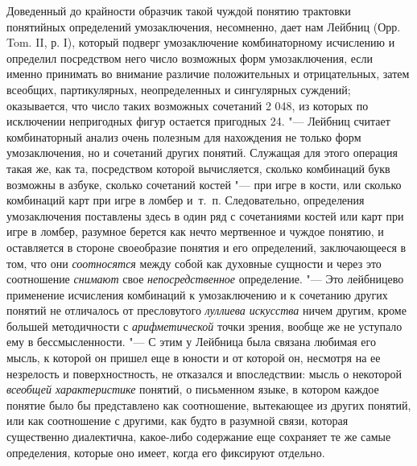 Доведенный до крайности образчик такой чуждой понятию
трактовки понятийных определений умозаключения, несомненно, дает нам Лейбниц
(Орр. Tom. II, р. I), который подверг умозаключение
комбинаторному исчислению и определил посредством него число возможных форм
умозаключения, если именно принимать во внимание различие положительных и
отрицательных, затем всеобщих, партикулярных, неопределенных и сингулярных
суждений; оказывается, что число таких возможных сочетаний 2 048, из
которых по исключении непригодных фигур остается пригодных 24. "---
Лейбниц считает комбинаторный анализ очень полезным для
нахождения не только форм умозаключения, но и сочетаний других понятий.
Служащая для этого операция такая же, как та, посредством которой
вычисляется, сколько комбинаций букв возможны в азбуке, сколько сочетаний
костей "--- при игре в кости, или сколько комбинаций карт при
игре в ломбер и~т.~п. Следовательно, определения умозаключения поставлены
здесь в один ряд с сочетаниями костей или карт при игре в ломбер, разумное
берется как нечто мертвенное и чуждое понятию, и оставляется в стороне
своеобразие понятия и его определений, заключающееся в том, что они
{\em соотносятся} между
собой как духовные сущности и через это соотношение
{\em снимают} свое
{\em непосредственное}
определение. "--- Это лейбницево
применение исчисления комбинаций к умозаключению и к сочетанию других
понятий не отличалось от пресловутого
{\em луллиева искусства}
ничем другим, кроме большей методичности с
{\em арифметической}
точки зрения, вообще же не уступало ему в бессмысленности. "---
С этим у Лейбница была связана любимая его мысль, к которой
он пришел еще в юности и от которой он, несмотря на ее незрелость и
поверхностность, не отказался и впоследствии: мысль о некоторой
{\em всеобщей характеристике}
понятий, о письменном языке, в котором каждое понятие было бы
представлено как соотношение, вытекающее из других понятий, или как
соотношение с другими, как будто в разумной связи, которая существенно
диалектична, какое-либо содержание еще сохраняет те же самые определения,
которые оно имеет, когда его фиксируют отдельно.

